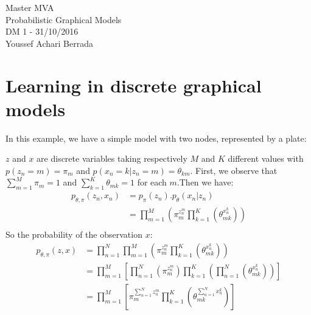 \documentclass[a4paper,10pt]{article}
\theoremstyle{exostyle}
\begin{document}
\begin{center}
Master MVA \\
Probabilistic Graphical Models \\
DM 1 - 31/10/2016\\
Youssef Achari Berrada \\
\end{center}

\section{Learning in discrete graphical models}
In this example, we have a simple model with two nodes, represented by a plate: \\
\begin{center}
\end{center}
$z$ and $x$ are discrete variables taking respectively $M$ and $K$ different values with $p(z_n = m) = \pi_m$ and $p(x_n=k | z_n=m) = \theta_{km}$. First, we observe that $ \sum_{m=1}^M \pi_m =1$ and $\sum_{k=1}^K \theta_{mk} = 1$ for each $m$.Then we have: 
\begin{align*}
p_{\theta,\pi}(z_n,x_n)  & = p_{\pi}(z_n) . p_{\theta}(x_n|z_n) \\
				&   = \prod_{m=1}^M \left( \pi_m^{z_n^m}  \prod_{k=1}^K \left( \theta_{mk}^{x_n^k}  \right)  \right) \\
\end{align*}
So the probability of the observation $x$: \\
\begin{align*}
p_{\theta,\pi}(z,x) &  = \prod_{n=1}^N \prod_{m=1}^M \left( \pi_m^{z_n^m}  \prod_{k=1}^K \left( \theta_{mk}^{x_n^k}  \right)  \right)  \\
					& = \prod_{m=1}^M  \left[ \prod_{n=1}^N ( \pi_m^{z_n^m} ) \prod_{k=1}^K \left( \prod_{n=1}^N ( \theta_{mk}^{x_n^k} )   \right) \right] \\
					& = \prod_{m=1}^M  \left[ \pi_m^{\sum_{n=1}^N z_n^m} \prod_{k=1}^K \left(\theta_{mk}^{\sum_{n=1}^N x_n^k}  \right) \right] 
\end{align*}
\end{document}
